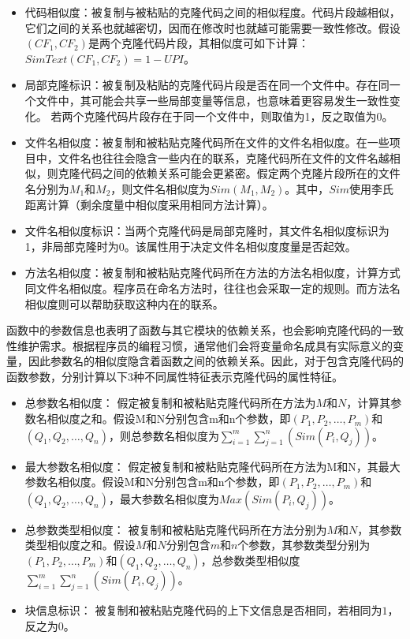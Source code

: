 \begin{itemize}
\item
代码相似度：被复制与被粘贴的克隆代码之间的相似程度。代码片段越相似，它们之间的关系也就越密切，因而在修改时也就越可能需要一致性修改。假设$(CF_1,CF_2) $是两个克隆代码片段，其相似度可如下计算：$\mathit{SimText} (CF_1,CF_2) = 1-\mathit{UPI}$。
\item
局部克隆标识：被复制及粘贴的克隆代码片段是否在同一个文件中。存在同一个文件中，其可能会共享一些局部变量等信息，也意味着更容易发生一致性变化。 若两个克隆代码片段存在于同一个文件中，则取值为1，反之取值为0。
\item
文件名相似度：被复制和被粘贴克隆代码所在文件的文件名相似度。在一些项目中，文件名也往往会隐含一些内在的联系，克隆代码所在文件的文件名越相似，则克隆代码之间的依赖关系可能会更紧密。假定两个克隆片段所在的文件名分别为$M_1$和$M_2$，则文件名相似度为$\mathit{Sim}(M_1,M_2)$。其中，$\mathit{Sim}$使用李氏距离\cite{levenshtein1966binary,navarro2001guided}计算（剩余度量中相似度采用相同方法计算）。
\item
文件名相似度标识：当两个克隆代码是局部克隆时，其文件名相似度标识为1，非局部克隆时为0。该属性用于决定文件名相似度度量是否起效。
\item
方法名相似度：被复制和被粘贴克隆代码所在方法的方法名相似度，计算方式同文件名相似度。程序员在命名方法时，往往也会采取一定的规则。而方法名相似度则可以帮助获取这种内在的联系。
\end{itemize}

函数中的参数信息也表明了函数与其它模块的依赖关系，也会影响克隆代码的一致性维护需求。根据程序员的编程习惯，通常他们会将变量命名成具有实际意义的变量，因此参数名的相似度隐含着函数之间的依赖关系。因此，对于包含克隆代码的函数参数，分别计算以下3种不同属性特征表示克隆代码的属性特征。
\begin{itemize}
\item
总参数名相似度：
假定被复制和被粘贴克隆代码所在方法为$M$和$N$，计算其参数名相似度之和。假设M和N分别包含m和n个参数，即$(P_1,P_2,…,P_m)$和$(Q_1,Q_2,…,Q_n)$，则总参数名相似度为$\mathit{\sum_{i=1}^m \sum_{j=1}^n (Sim(P_i,Q_j))}$。
\item
最大参数名相似度：
假定被复制和被粘贴克隆代码所在方法为M和N，其最大参数名相似度。假设M和N分别包含m和n个参数，即$(P_1,P_2,…,P_m)$和$(Q_1,Q_2,…,Q_n)$，最大参数名相似度为$\mathit{Max (Sim(P_i,Q_j))}$。
\item 
总参数类型相似度：
被复制和被粘贴克隆代码所在方法分别为$M$和$N$，其参数类型相似度之和。假设$M$和$N$分别包含$m$和$n$个参数，其参数类型分别为$(P_1,P_2,…,P_m)$和$(Q_1,Q_2,…,Q_n)$，总参数类型相似度$\mathit{\sum_{i=1}^m \sum_{j=1}^n (Sim(P_i,Q_j))}$。
\item
块信息标识：
被复制和被粘贴克隆代码的上下文信息是否相同，若相同为$1$，反之为$0$。
\end{itemize}

